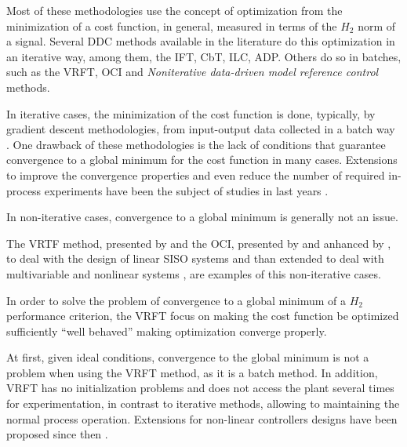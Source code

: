 Most of these methodologies use the concept of optimization from the minimization of a cost function, in general, measured in terms of the $H_2$ norm of a signal. 
Several DDC methods available in the literature do this optimization in an iterative way, among them, the IFT, CbT, ILC, ADP. 
Others do so in batches, such as the VRFT, OCI and \textit{Noniterative data-driven model reference control} methods. 

In iterative cases, the minimization of the cost function is done, typically, by gradient descent methodologies, from input-output data collected in a batch way \citep{bazanella2008a}.
One drawback of these methodologies is the lack of conditions that guarantee convergence to a global minimum for the cost function in many cases.
Extensions to improve the convergence properties and even reduce the number of required in-process experiments have been the subject of studies in last years \citep{huusom2009}.

In non-iterative cases, convergence to a global minimum is generally not an issue. 

The VRTF method, presented by \cite{guardabassi2000a, campi2002} and the OCI, presented by \cite{campestrini2012} and anhanced by \cite{campestrini2017}, to deal with the design of linear SISO systems and than extended to deal with multivariable \citep{dasilvaMultivariableVirtualReference2018, huffDataDrivenControlDesign2019}  and nonlinear systems \citep{campi2006}, are examples of this non-iterative cases. 

In order to solve the problem of convergence to a global minimum of a $ H_2 $ performance criterion, the VRFT focus on making the cost function be optimized sufficiently ``well behaved'' making optimization converge properly.

At first, given ideal conditions, convergence to the global minimum is not a problem when using the VRFT method, as it is a batch method. 
In addition, VRFT has no initialization problems and does not access the plant several times for experimentation, in contrast to iterative methods, allowing to maintaining the normal process operation. 
Extensions for non-linear controllers designs have been proposed since then \citep{campi2006, jeng2014a, jeng2018a}.

